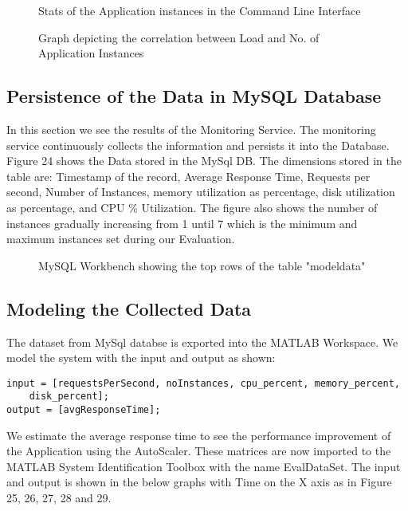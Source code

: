 \documentclass[article,type=msc,colorback,12pt,accentcolor=tud7b,table]{tudthesis}
\begin{document}
	  \begin{figure}[h]
	  	\begin{center}
	  		\makebox[\textwidth]{\texttt{[image: E4]}}
	  	\end{center}
	  	\caption{Stats of the Application instances in the Command Line Interface}
	  \end{figure}
	  
	  	  \begin{figure}[h]
	  	  	\begin{center}
	  	  		\makebox[\textwidth]{\texttt{[image: E5]}}
	  	  	\end{center}
	  	  	\caption{Graph depicting the correlation between Load and No. of Application Instances}
	  	  \end{figure}
	
	\subsection{Persistence of the Data in MySQL Database}
	In this section we see the results of the Monitoring Service. The monitoring service continuously collects the information and persists it into the Database.  Figure 24 shows the Data stored in the MySql DB. The dimensions stored in the table are: Timestamp of the record, Average Response Time, Requests per second, Number of Instances, memory utilization as percentage, disk utilization as percentage, and CPU \% Utilization. The figure also shows the number of instances gradually increasing from 1 until 7 which is the minimum and maximum instances set during our Evaluation.
	
		  	  \begin{figure}[h]
		  	  	\begin{center}
		  	  		\makebox[\textwidth]{\texttt{[image: E6]}}
		  	  	\end{center}
		  	  	\caption{MySQL Workbench showing the top rows of the table "modeldata"}
		  	  \end{figure}
	
	\subsection{Modeling the Collected Data}
	
	The dataset from MySql databse is exported into the MATLAB Workspace. We model the system with the input and output as shown:
\begin{lstlisting} 
input = [requestsPerSecond, noInstances, cpu_percent, memory_percent, 
	disk_percent];
output = [avgResponseTime];
\end{lstlisting}
 We estimate the average response time to see the performance improvement of the Application using the AutoScaler. These matrices are now imported to the MATLAB System Identification Toolbox with the name EvalDataSet. The input and output is shown in the below graphs with Time on the X axis as in Figure 25, 26, 27, 28 and 29.
	
\end{document}
